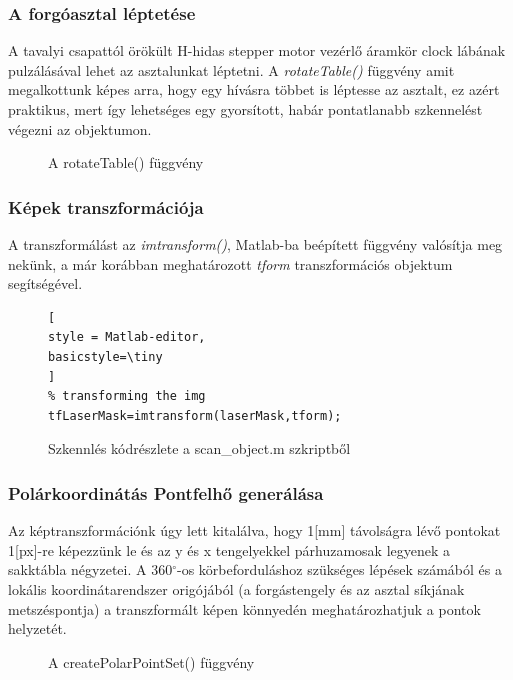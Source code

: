 \documentclass[12pt,a4paper]{article}
\begin{document}
\subsubsection{A forgóasztal léptetése}
A tavalyi csapattól örökült H-hidas stepper motor vezérlő áramkör clock lábának pulzálásával lehet az asztalunkat léptetni. A \textit{rotateTable()} függvény amit megalkottunk képes arra, hogy egy hívásra többet is léptesse az asztalt, ez azért praktikus, mert így lehetséges egy gyorsított, habár pontatlanabb szkennelést végezni az objektumon. 
\begin{figure}
\centering

\caption{A rotateTable() függvény}
\end{figure}

\subsubsection{Képek transzformációja}
A transzformálást az \textit{imtransform()}, Matlab-ba beépített függvény valósítja meg nekünk, a már korábban meghatározott \textit{tform} transzformációs objektum segítségével.
\begin{figure}[h!]
\centering
\begin{lstlisting}[
style = Matlab-editor,
basicstyle=\tiny
]
% transforming the img
tfLaserMask=imtransform(laserMask,tform);
\end{lstlisting}
\caption{Szkennlés kódrészlete a scan\_object.m szkriptből}
\end{figure}
\subsubsection{Polárkoordinátás Pontfelhő generálása}
Az képtranszformációnk úgy lett kitalálva, hogy 1[mm] távolságra lévő pontokat 1[px]-re képezzünk le és az y és x tengelyekkel párhuzamosak legyenek a sakktábla négyzetei. A 360$^\circ$-os körbeforduláshoz szükséges lépések számából és a lokális koordinátarendszer origójából (a forgástengely és az asztal síkjának metszéspontja) a transzformált képen könnyedén meghatározhatjuk a pontok helyzetét. 
\begin{figure}[h!]
\centering

\caption{A createPolarPointSet() függvény}
\end{figure}
\end{document}
